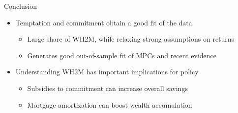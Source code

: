 \documentclass[10pt,english,t,10pt]{beamer}
\begin{document}
\begin{frame} {Conclusion}


\begin{itemize}

\item Temptation and commitment obtain a good fit of the data
\begin{itemize}
\medskip
\item Large share of WH2M, while relaxing strong assumptions on returns
\medskip
\item Generates good out-of-sample fit of MPCs and recent evidence 

\end{itemize}
%

\medskip \medskip \medskip
\pause
\item Understanding WH2M has important implications for policy
\begin{itemize}
\medskip
\item Subsidies to commitment can increase overall savings
\medskip
\item Mortgage amortization can boost wealth accumulation
\end{itemize}

\end{itemize}

\end{frame}
\end{document}
